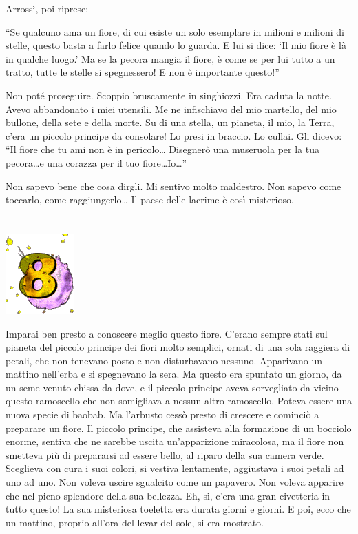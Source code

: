 \documentclass[11pt]{scrbook}
\begin{document}
Arrossì, poi riprese:

``Se qualcuno ama un fiore, di cui esiste un solo esemplare in milioni e milioni di stelle, questo basta a farlo felice quando lo guarda. E lui si dice: `Il mio fiore è là in qualche luogo.' Ma se la pecora mangia il fiore, è come se per lui tutto a un tratto, tutte le stelle si spegnessero! E non è importante questo!''

Non poté proseguire. Scoppio bruscamente in singhiozzi. Era caduta la notte. Avevo abbandonato i miei utensili. Me ne infischiavo del mio martello, del mio bullone, della sete e della morte. Su di una stella, un pianeta, il mio, la Terra, c'era un piccolo principe da consolare! Lo presi in braccio. Lo cullai. Gli dicevo: ``Il fiore che tu ami non è in pericolo\ldots{} Disegnerò una museruola per la tua pecora\ldots{}e una corazza per il tuo fiore\ldots{}Io\ldots{}''

Non sapevo bene che cosa dirgli. Mi sentivo molto maldestro. Non sapevo come toccarlo, come raggiungerlo\ldots{} Il paese delle lacrime è così misterioso.

\chapter{}
\begin{center}
\includegraphics{img/chapter8}
\end{center}

Imparai ben presto a conoscere meglio questo fiore. C'erano sempre stati sul pianeta del piccolo principe dei fiori molto semplici, ornati di una sola raggiera di petali, che non tenevano posto e non disturbavano nessuno. Apparivano un mattino nell'erba e si spegnevano la sera. Ma questo era spuntato un giorno, da un seme venuto chissa da dove, e il piccolo principe aveva sorvegliato da vicino questo ramoscello che non somigliava a nessun altro ramoscello. Poteva essere una nuova specie di baobab. Ma l'arbusto cessò presto di crescere e cominciò a preparare un fiore. Il piccolo principe, che assisteva alla formazione di un bocciolo enorme, sentiva che ne sarebbe uscita un'apparizione miracolosa, ma il fiore non smetteva più di prepararsi ad essere bello, al riparo della sua camera verde. Sceglieva con cura i suoi colori, si vestiva lentamente, aggiustava i suoi petali ad uno ad uno. Non voleva uscire sgualcito come un papavero. Non voleva apparire che nel pieno splendore della sua bellezza. Eh, sì, c'era una gran civetteria in tutto questo! La sua misteriosa toeletta era durata giorni e giorni. E poi, ecco che un mattino, proprio all'ora del levar del sole, si era mostrato.
\end{document}
